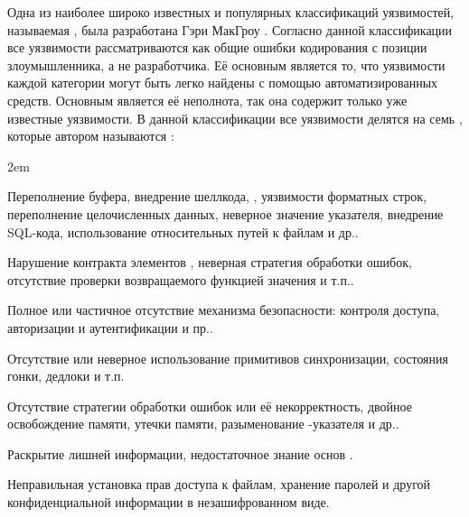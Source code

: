 %
Одна из наиболее широко известных и популярных классификаций уязвимостей, называемая , была разработана Гэри МакГроу   . 
%
Согласно данной классификации все уязвимости рассматриваются как общие ошибки кодирования с позиции злоумышленника, а не разработчика. 
%
Её основным  является то, что уязвимости каждой категории могут быть легко найдены с помощью автоматизированных средств. 
%
Основным  является её неполнота, так она содержит только уже известные уязвимости. 
%
В данной классификации все уязвимости делятся на семь , которые автором называются :  
\begin{description}
	\leftskip2em%
	\setlength{\itemsep}{0pt}%
	\setlength{\parsep}{0pt}%

	\item[Проверка входных данных и их представление.] Переполнение буфера, внедрение шеллкода, , уязвимости форматных строк, переполнение целочисленных данных, неверное значение указателя, внедрение SQL-кода, использование относительных путей к файлам и др..
	
	\item[Неправильное использование API.] Нарушение контракта элементов , неверная стратегия обработки ошибок, отсутствие проверки возвращаемого функцией значения и т.п..

	\item[Средства безопасности.] Полное или частичное отсутствие механизма безопасности: контроля доступа, авторизации и аутентификации и пр..

	\item[Время и состояние.] Отсутствие или неверное использование примитивов синхронизации, состояния гонки, дедлоки и т.п.
	
	\item[Ошибки.] Отсутствие стратегии обработки ошибок или её некорректность, двойное освобождение памяти, утечки памяти, разыменование -указателя и др..
	
	\item[Инкапсуляция.] Раскрытие лишней информации, недостаточное знание основ .
	
	\item[Программное окружение.] Неправильная установка прав доступа к файлам, хранение паролей и другой конфиденциальной информации в незашифрованном виде.
\end{description}

